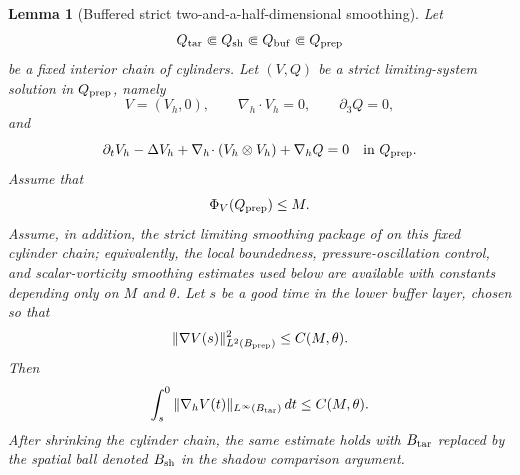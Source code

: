 \documentclass[11pt]{article}
\numberwithin{equation}{section}
\theoremstyle{plain}
\newtheorem{lemma}{Lemma}[section]
\theoremstyle{definition}
\theoremstyle{remark}
\newcommand{\nabh}{\nabla_h}
\newcommand{\divh}{\nabla_h\!\cdot}
\begin{document}
\begin{lemma}[Buffered strict two-and-a-half-dimensional smoothing]
\label{pI:lem:buffered-strict-smoothing}
Let
\[
        Q_{\rm tar}\Subset Q_{\rm sh}\Subset Q_{\rm buf}\Subset Q_{\rm prep}
\]
be a fixed interior chain of cylinders.  Let $(V,Q)$ be a strict limiting-system solution in $Q_{\rm prep}$, namely
\[
        V=(V_h,0),\qquad \divh V_h=0,\qquad \partial_3Q=0,
\]
and
\[
        \partial_tV_h-\Delta V_h+\divh(V_h\otimes V_h)+\nabh Q=0
        \quad\text{in }Q_{\rm prep}.
\]
Assume that
\[
        \Phi_V(Q_{\rm prep})\le M.
\]
Assume, in addition, the strict limiting smoothing package of  on this fixed cylinder chain; equivalently, the local boundedness, pressure-oscillation control, and scalar-vorticity smoothing estimates used below are available with constants depending only on \(M\) and \(\theta\).  Let $s$ be a good time in the lower buffer layer, chosen so that
\begin{equation}\label{pI:eq:good-time-gradient-strict-shadow}
        \|\nabla V(s)\|_{L^2(B_{\rm prep})}^2\le C(M,\theta).
\end{equation}
Then
\begin{equation}\label{pI:eq:buffered-gradient-bound}
        \int_s^0\|\nabh V(t)\|_{L^\infty(B_{\rm tar})}\,dt
        \le C(M,\theta).
\end{equation}
After shrinking the cylinder chain, the same estimate holds with $B_{\rm tar}$ replaced by the spatial ball denoted $B_{\rm sh}$ in the shadow comparison argument.
\end{lemma}
\end{document}
